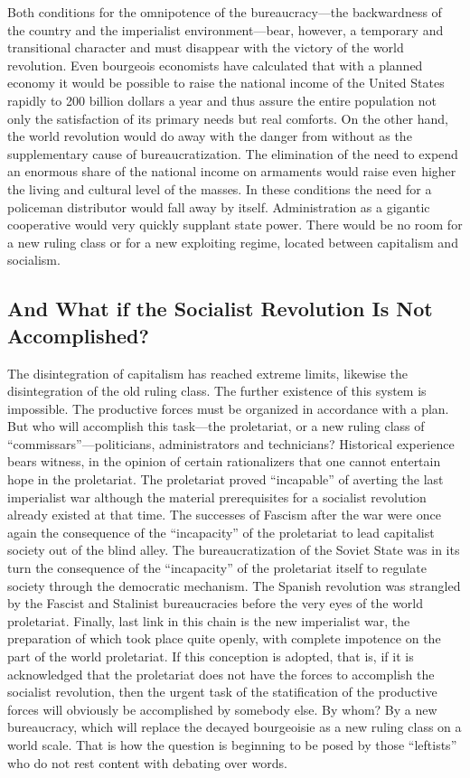 Both conditions for the omnipotence of the bureaucracy---the backwardness of the country and the imperialist environment---bear, however, a temporary and transitional character and must disappear with the victory of the world revolution. Even bourgeois economists have calculated that with a planned economy it would be possible to raise the national income of the United States rapidly to 200 billion dollars a year and thus assure the entire population not only the satisfaction of its primary needs but real comforts. On the other hand, the world revolution would do away with the danger from without as the supplementary cause of bureaucratization. The elimination of the need to expend an enormous share of the national income on armaments would raise even higher the living and cultural level of the masses. In these conditions the need for a policeman distributor would fall away by itself. Administration as a gigantic cooperative would very quickly supplant state power. There would be no room for a new ruling class or for a new exploiting regime, located between capitalism and socialism.

\subsection*{And What if the Socialist Revolution Is Not Accomplished?}

The disintegration of capitalism has reached extreme limits, likewise the disintegration of the old ruling class. The further existence of this system is impossible. The productive forces must be organized in accordance with a plan. But who will accomplish this task---the proletariat, or a new ruling class of “commissars”---politicians, administrators and technicians? Historical experience bears witness, in the opinion of certain rationalizers that one cannot entertain hope in the proletariat. The proletariat proved “incapable” of averting the last imperialist war although the material prerequisites for a socialist revolution already existed at that time. The successes of Fascism after the war were once again the consequence of the “incapacity” of the proletariat to lead capitalist society out of the blind alley. The bureaucratization of the Soviet State was in its turn the consequence of the “incapacity” of the proletariat itself to regulate society through the democratic mechanism. The Spanish revolution was strangled by the Fascist and Stalinist bureaucracies before the very eyes of the world proletariat. Finally, last link in this chain is the new imperialist war, the preparation of which took place quite openly, with complete impotence on the part of the world proletariat. If this conception is adopted, that is, if it is acknowledged that the proletariat does not have the forces to accomplish the socialist revolution, then the urgent task of the statification of the productive forces will obviously be accomplished by somebody else. By whom? By a new bureaucracy, which will replace the decayed bourgeoisie as a new ruling class on a world scale. That is how the question is beginning to be posed by those “leftists” who do not rest content with debating over words.

